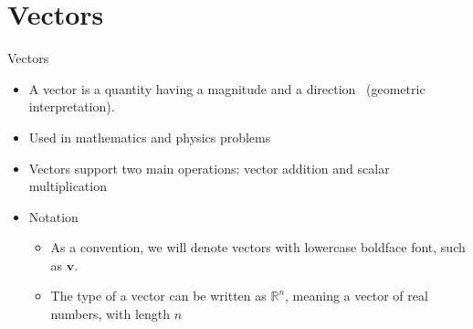 \documentclass[aspectratio=169,xcolor=dvipsnames]{beamer}
\begin{document}



\section{Vectors}

\begin{frame}{Vectors}
      \begin{itemize}
      \item A vector is a quantity having a magnitude and a direction~\cite{Wikipedia_Vectors_2024} (geometric interpretation).
      \item Used in mathematics and physics problems
      \item Vectors support two main operations: vector addition and scalar multiplication
      \item Notation
            \begin{itemize}
                  \item As a convention, we will denote vectors with lowercase boldface
                        font, such as $\mathbf{v}$.
                  \item The type of a vector can be written as $\mathbb{R}^n$, meaning
                        a vector of real numbers, with length $n$
            \end{itemize}
      \end{itemize}
\end{frame}
\end{document}
